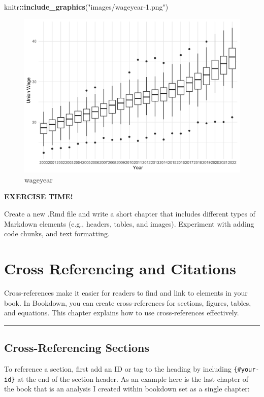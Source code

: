 \documentclass[
]{book}
\newenvironment{Shaded}{\begin{snugshade}}{\end{snugshade}}
\newcommand{\FunctionTok}[1]{\textcolor[rgb]{0.13,0.29,0.53}{\textbf{#1}}}
\newcommand{\NormalTok}[1]{#1}
\newcommand{\SpecialCharTok}[1]{\textcolor[rgb]{0.81,0.36,0.00}{\textbf{#1}}}
\newcommand{\StringTok}[1]{\textcolor[rgb]{0.31,0.60,0.02}{#1}}
\newenvironment{blackbox}{
  \definecolor{shadecolor}{rgb}{0, 0, 0}
  \color{white}
  \begin{shaded}
  }
 {\end{shaded}}
\theoremstyle{definition}
\theoremstyle{definition}
\theoremstyle{definition}
\theoremstyle{definition}
\theoremstyle{remark}
\begin{document}
\begin{Shaded}
\begin{Highlighting}[]
\NormalTok{knitr}\SpecialCharTok{::}\FunctionTok{include\_graphics}\NormalTok{(}\StringTok{"images/wageyear{-}1.png"}\NormalTok{)}
\end{Highlighting}
\end{Shaded}

\begin{figure}
\includegraphics[width=0.25\linewidth]{images/wageyear-1} \caption{wageyear}\label{fig:unnamed-chunk-8}
\end{figure}

\begin{blackbox}

\begin{center}
\textbf{EXERCISE TIME!}

\end{center}

Create a new .Rmd file and write a short chapter that includes different types of Markdown elements (e.g., headers, tables, and images). Experiment with adding code chunks, and text formatting.

\end{blackbox}

\chapter{Cross Referencing and Citations}\label{chapter4}

Cross-references make it easier for readers to find and link to elements in your book. In Bookdown, you can create cross-references for sections, figures, tables, and equations. This chapter explains how to use cross-references effectively.

\begin{center}\rule{0.5\linewidth}{0.5pt}\end{center}

\section{Cross-Referencing Sections}\label{cross-referencing-sections}

To reference a section, first add an ID or tag to the heading by including \texttt{\{\#your-id\}} at the end of the section header. As an example here is the last chapter of the book that is an analysis I created within bookdown set as a single chapter:
\end{document}
